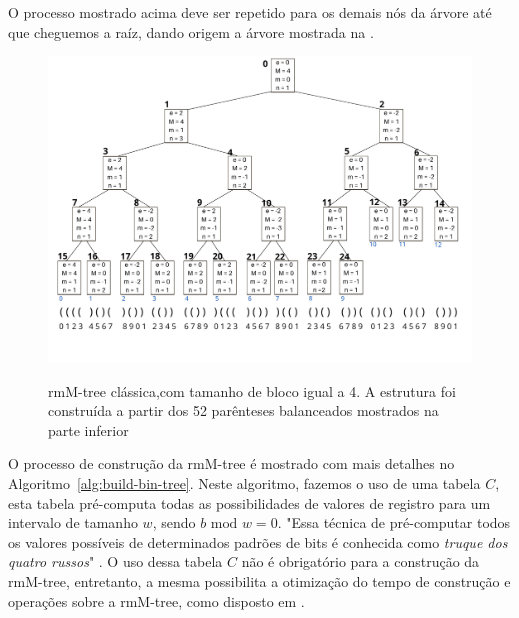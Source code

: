 \begin{example}
    O processo mostrado acima deve ser repetido para os demais nós da árvore até que cheguemos a raíz, dando origem a árvore mostrada na . 
    \begin{figure}[!ht]
     \centering
      \caption[rmM-tree clássica.]{rmM-tree clássica,com tamanho de bloco igual a 4. A estrutura foi construída a partir dos 52 parênteses balanceados mostrados na parte inferior}
      \includegraphics[width=\columnwidth]{images/rmm-tree-bin.png}
      \label{fig:rmm-tree-binaria}
    \end{figure}
\end{example}

O processo de construção da rmM-tree é mostrado com mais detalhes no Algoritmo~\ref{alg:build-bin-tree}. Neste algoritmo, fazemos o uso de uma tabela $C$, esta tabela pré-computa todas as possibilidades de valores de registro para um intervalo de tamanho $w$, sendo $b \mbox{ mod } w = 0$. "Essa técnica de pré-computar todos os valores possíveis de determinados padrões de bits é conhecida como \textit{truque dos quatro russos}" \citep[tradução nossa]{book-gusfield}.
O uso dessa tabela $C$ não é obrigatório para a construção da rmM-tree, entretanto, a mesma possibilita a otimização do tempo de construção e operações sobre a rmM-tree, como disposto em \citet{book-compact-data-structures}.

